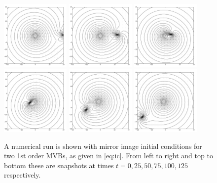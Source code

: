 \documentclass[12pt]{amsart}
\theoremstyle{remark}
\begin{document}
\begin{figure}[h!]
	\centering
	\includegraphics[width=0.3\textwidth]{./images/scattering/frame_time_0}
	\includegraphics[width=0.3\textwidth]{./images/scattering/frame_time_25}
	\includegraphics[width=0.3\textwidth]{./images/scattering/frame_time_50}
	\includegraphics[width=0.3\textwidth]{./images/scattering/frame_time_75}
	\includegraphics[width=0.3\textwidth]{./images/scattering/frame_time_101}
	\includegraphics[width=0.3\textwidth]{./images/scattering/frame_time_126}
	\caption{A numerical run is shown with mirror image initial conditions for two 1st order MVBs, as given in \eqref{eq:ic}.
		From left to right and top to bottom these are snapshots at times $t=0,25,50,75,100,125$ respectively.}
	\label{fig:scatter}
\end{figure}
\end{document}
